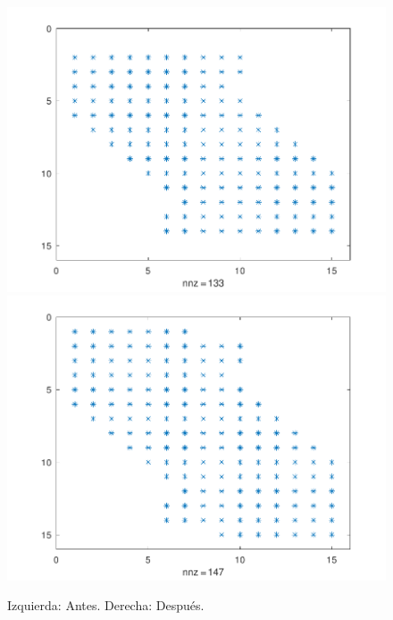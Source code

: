\begin{problem}
\begin{figure}[ht!]
    \centering
    \includegraphics[width=.39\paperwidth]{../examples/octave/elliptic1Dsparsebefore.pdf}
    \includegraphics[width=.39\paperwidth]{../examples/octave/elliptic1Dsparseafter.pdf}
    \caption{Izquierda: Antes. Derecha: Después.}
\end{figure}


\end{problem}
